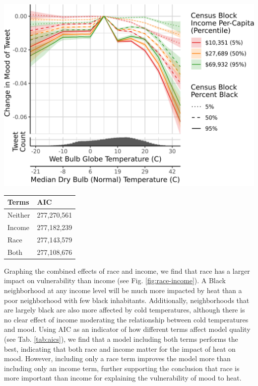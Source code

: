 \documentclass[fleqn,10pt]{wlscirep}
\begin{document}
\begin{minipage}{.65\textwidth}
\centering
\includegraphics[width=\textwidth]{../res/wbgt-income-race.png}
\label{fig:race-income}
\end{minipage}\hfill
\begin{minipage}{.35\textwidth}
\centering
\begin{tabular}{| l | l |}
\hline
Terms & AIC \\
\hline
Neither & 277,270,561 \\
Income & 277,182,239 \\
Race & 277,143,579 \\
Both & 277,108,676 \\
\hline
\end{tabular}
\label{tab:aics}
\end{minipage}

Graphing the combined effects of race and income, we find that race has a larger impact on vulnerability than income (see Fig. \ref{fig:race-income}). A Black neighborhood at any income level will be much more impacted by heat than a poor neighborhood with few black inhabitants. Additionally, neighborhoods that are largely black are also more affected by cold temperatures, although there is no clear effect of income moderating the relationship between cold temperatures and mood. Using AIC as an indicator of how different terms affect model quality (see Tab. \ref{tab:aics}), we find that a model including both terms performs the best, indicating that both race and income matter for the impact of heat on mood. However, including only a race term improves the model more than including only an income term, further supporting the conclusion that race is more important than income for explaining the vulnerability of mood to heat.
\end{document}

